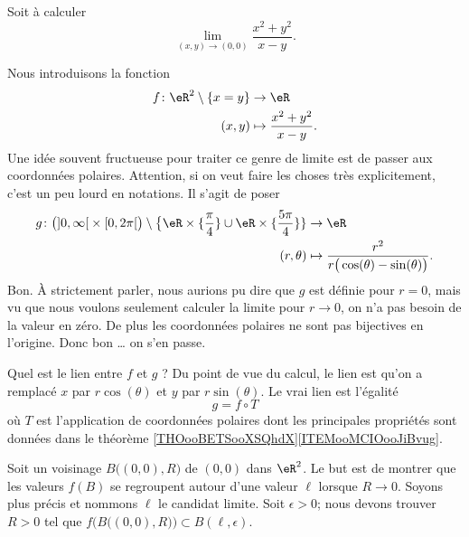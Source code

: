 \begin{example}     \label{EXooSDHDooJzDioW}
	Soit à calculer
	\begin{equation}
		\lim_{(x,y)\to(0,0)}\frac{ x^2+y^2 }{ x-y }.
	\end{equation}

	Nous introduisons la fonction
	\begin{equation}
		\begin{aligned}
			f\colon \eR^2\setminus\{ x=y \} & \to \eR                          \\
			(x,y)                           & \mapsto \frac{ x^2+y^2 }{ x-y }.
		\end{aligned}
	\end{equation}
	Une idée souvent fructueuse pour traiter ce genre de limite est de passer aux coordonnées polaires. Attention, si on veut faire les choses très explicitement, c'est un peu lourd en notations. Il s'agit de poser
	\begin{equation}
		\begin{aligned}
			g\colon \big( \mathopen] 0 , \infty \mathclose[\times\mathopen[ 0 , 2\pi \mathclose[ \big)\setminus\big\{ \eR\times\{ \frac{ \pi }{ 4 }\}\cup\eR\times \{ \frac{ 5\pi }{ 4 } \} \} & \to \eR                                                         \\
			(r,\theta)                                                                                                                                                                         & \mapsto \frac{ r^2 }{ r\big( \cos(\theta)-\sin(\theta) \big) }.
		\end{aligned}
	\end{equation}
	Bon. À strictement parler, nous aurions pu dire que \( g\) est définie pour \( r=0\), mais vu que nous voulons seulement calculer la limite pour \( r\to 0\), on n'a pas besoin de la valeur en zéro. De plus les coordonnées polaires ne sont pas bijectives en l'origine. Donc bon \ldots{} on s'en passe.

	Quel est le lien entre \( f\) et \( g \) ? Du point de vue du calcul, le lien est qu'on a remplacé \( x\) par \( r\cos(\theta)\) et \( y\) par \( r\sin(\theta)\). Le vrai lien est l'égalité
	\begin{equation}
		g=f\circ T
	\end{equation}
	où \( T\) est l'application de coordonnées polaires dont les principales propriétés sont données dans le théorème \ref{THOooBETSooXSQhdX}\ref{ITEMooMCIOooJiBvug}.

	Soit un voisinage \( B\big( (0,0), R \big)\) de \( (0,0)\) dans \( \eR^2\). Le but est de montrer que les valeurs \( f(B)\) se regroupent autour d'une valeur \( \ell\) lorsque \( R\to 0\). Soyons plus précis et nommons \( \ell\) le candidat limite. Soit \( \epsilon>0\); nous devons trouver \( R>0\) tel que \( f\Big( B\big( (0,0),R \big) \Big)\subset B(\ell,\epsilon)\).


\end{example}
